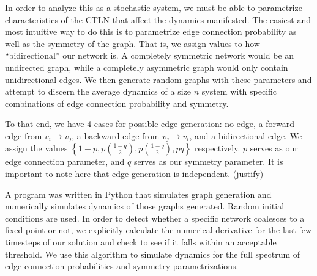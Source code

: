 In order to analyze this as a stochastic system, we must be able to parametrize characteristics of the CTLN that affect the dynamics manifested. The easiest and most intuitive way to do this is to parametrize edge connection probability as well as the symmetry of the graph. That is, we assign values to how ``bidirectional'' our network is. A completely symmetric network would be an undirected graph, while a completely asymmetric graph would only contain unidirectional edges. We then generate random graphs with these parameters and attempt to discern the average dynamics of a size $n$ system with specific combinations of edge connection probability and symmetry.

To that end, we have 4 cases for possible edge generation: no edge, a forward edge from $v_i\to v_j$, a backward edge from $v_j\to v_i$, and a bidirectional edge. We assign the values $\left\{1-p, p \left( \frac{1-q}{2}  \right), p \left( \frac{1-q}{2}  \right), pq \right\}$ respectively. $p$ serves as our edge connection parameter, and $q$ serves as our symmetry parameter. It is important to note here that edge generation is independent. (justify)

A program was written in Python that simulates graph generation and numerically simulates dynamics of those graphs generated. Random initial conditions are used. In order to detect whether a specific network coalesces to a fixed point or not, we explicitly calculate the numerical derivative for the last few timesteps of our solution and check to see if it falls within an acceptable threshold. We use this algorithm to simulate dynamics for the full spectrum of edge connection probabilities and symmetry parametrizations. 

